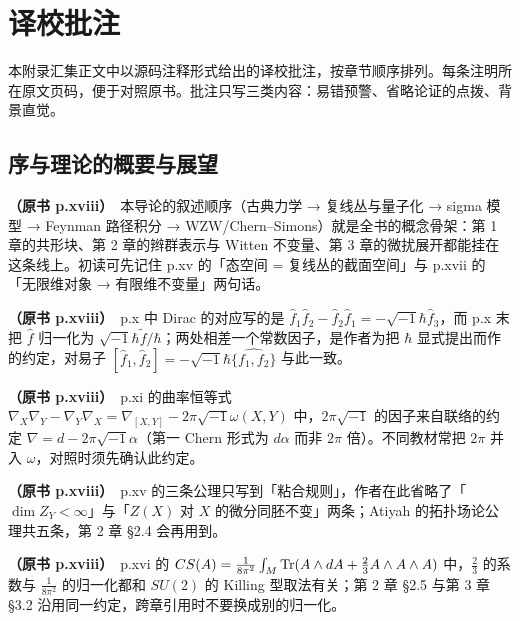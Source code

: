 \chapter{译校批注}

本附录汇集正文中以源码注释形式给出的译校批注，按章节顺序排列。每条注明所在原文页码，便于对照原书。批注只写三类内容：易错预警、省略论证的点拨、背景直觉。\par\medskip

\section*{序与理论的概要与展望}

\noindent \textbf{（原书 p.xviii）}\ 本导论的叙述顺序（古典力学 → 复线丛与量子化 → sigma 模型 → Feynman 路径积分 → WZW/Chern--Simons）就是全书的概念骨架：第 1 章的共形块、第 2 章的辫群表示与 Witten 不变量、第 3 章的微扰展开都能挂在这条线上。初读可先记住 p.xv 的「态空间 = 复线丛的截面空间」与 p.xvii 的「无限维对象 → 有限维不变量」两句话。\par\smallskip

\noindent \textbf{（原书 p.xviii）}\ p.x 中 Dirac 的对应写的是 $\hat f_1\hat f_2-\hat f_2\hat f_1=-\sqrt{-1}\hbar\hat f_3$，而 p.x 末把 $\hat f$ 归一化为 $\sqrt{-1}\hbar\tilde f/\hbar$；两处相差一个常数因子，是作者为把 $\hbar$ 显式提出而作的约定，对易子 $[\hat f_1,\hat f_2]=-\sqrt{-1}\hbar\widehat{\{f_1,f_2\}}$ 与此一致。\par\smallskip

\noindent \textbf{（原书 p.xviii）}\ p.xi 的曲率恒等式 $\nabla_X\nabla_Y-\nabla_Y\nabla_X=\nabla_{[X,Y]}-2\pi\sqrt{-1}\omega(X,Y)$ 中，$2\pi\sqrt{-1}$ 的因子来自联络的约定 $\nabla=d-2\pi\sqrt{-1}\alpha$（第一 Chern 形式为 $d\alpha$ 而非 $2\pi$ 倍）。不同教材常把 $2\pi$ 并入 $\omega$，对照时须先确认此约定。\par\smallskip

\noindent \textbf{（原书 p.xviii）}\ p.xv 的三条公理只写到「粘合规则」，作者在此省略了「$\dim Z_Y<\infty$」与「$Z(X)$ 对 $X$ 的微分同胚不变」两条；Atiyah 的拓扑场论公理共五条，第 2 章 §2.4 会再用到。\par\smallskip

\noindent \textbf{（原书 p.xviii）}\ p.xvi 的 $CS(A)=\frac{1}{8\pi^{2}}\int_M\operatorname{Tr}(A\wedge dA+\frac{2}{3}A\wedge A\wedge A)$ 中，$\frac{2}{3}$ 的系数与 $\frac{1}{8\pi^{2}}$ 的归一化都和 $SU(2)$ 的 Killing 型取法有关；第 2 章 §2.5 与第 3 章 §3.2 沿用同一约定，跨章引用时不要换成别的归一化。\par\smallskip

